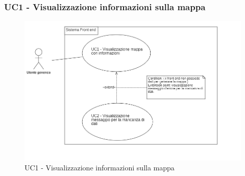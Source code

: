 \subsubsection{UC1 - Visualizzazione informazioni sulla mappa} \label{visualizzazioneInfoMappa} %
\begin{center}
	\begin{figure}[H]
		\includegraphics[scale=0.8]{../immagini/attori_casi/uc1_uc2.png}
		\caption{UC1 - Visualizzazione informazioni sulla mappa}
	\end{figure}
\end{center}
